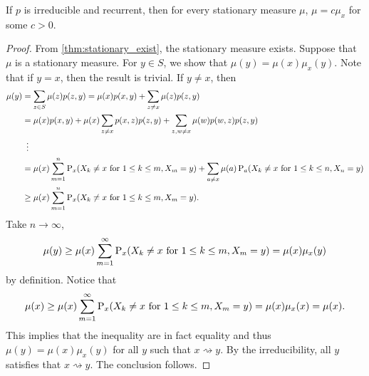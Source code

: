 \begin{theorem}\label{thm:stationary_unique}
    If $p$ is irreducible and recurrent, then for every 
    stationary measure $\mu$, $\mu = c\mu_x$ for some 
    $c>0$. 
\end{theorem}
\begin{proof}
    From \cref{thm:stationary_exist}, the stationary 
    measure exists. Suppose that $\mu$ is a stationary measure. 
    For $y\in S$, we show that $\mu(y) = \mu(x)\mu_x(y)$. 
    Note that if $y = x$, then the result is trivial. 
    If $y\neq x$, then 
    \begin{equation*}
        \begin{split}
            \mu(y) &= \sum_{z\in S}\mu(z)p(z,y) 
            = \mu(x)p(x,y) + \sum_{z\neq x}\mu(z)p(z,y) \\
            &= \mu(x)p(x,y) + \mu(x)\sum_{z\neq x}p(x,z)p(z,y) + \sum_{z,w\neq x}\mu(w)p(w,z)p(z,y) \\
            &\hspace{0.5em}\vdots \\ 
            &= \mu(x)\sum_{m=1}^n\P_x(X_k\neq x\text{ for $1\leq k\leq m$}, X_m = y) 
            + \sum_{a\neq x}\mu(a)\P_a(X_k\neq x\text{ for $1\leq k\leq n$}, X_n = y) \\
            &\geq \mu(x)\sum_{m=1}^n\P_x(X_k\neq x\text{ for $1\leq k\leq m$}, X_m = y). 
        \end{split}
    \end{equation*}
    Take $n\to\infty$, 
    \begin{equation*}
        \mu(y)\geq \mu(x)\sum_{m=1}^\infty\P_x(X_k\neq x\text{ for $1\leq k\leq m$}, X_m = y) 
        = \mu(x)\mu_x(y)
    \end{equation*}
    by definition. Notice that 
    \begin{equation*}
        \mu(x)\geq \mu(x)\sum_{m=1}^\infty\P_x(X_k\neq x\text{ for $1\leq k\leq m$}, X_m = y) 
        = \mu(x)\mu_x(x) = \mu(x). 
    \end{equation*}
    This implies that the inequality are in fact equality and 
    thus $\mu(y) = \mu(x)\mu_x(y)$ for all $y$ such that 
    $x\rightsquigarrow y$. By the irreducibility, all $y$ 
    satisfies that $x\rightsquigarrow y$. The conclusion 
    follows. 
\end{proof}

